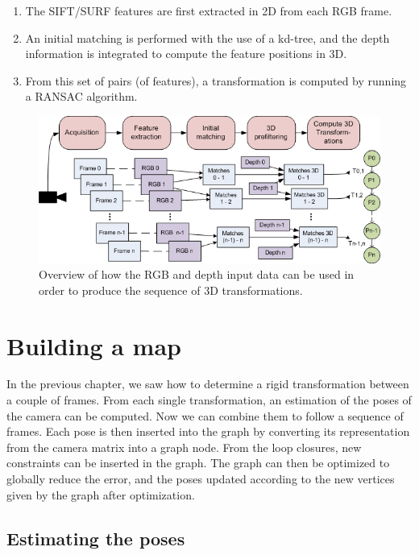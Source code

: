 \begin{enumerate}
\item The \gls{SIFT}/\gls{SURF} features are first extracted in 2D from each RGB frame.
\item An initial matching is performed with the use of a kd-tree, and the depth information is integrated to compute the feature positions in 3D.
\item From this set of pairs (of features), a transformation is computed by running a \gls{RANSAC} algorithm.
\end{enumerate}

\begin{figure}[H]
\centering
\includegraphics[width=1.0\textwidth]{figures/overview_rgb_depth}
\caption{Overview of how the RGB and depth input data can be used in order to produce the sequence of 3D transformations.}
\end{figure}

\chapter{Building a map}
\label{chap:map}

In the previous chapter, we saw how to determine a rigid transformation between a couple of frames. From each single transformation, an estimation of the poses of the camera can be computed. Now we can combine them to follow a sequence of frames. Each pose is then inserted into the graph by converting its representation from the camera matrix into a graph node. From the loop closures, new constraints can be inserted in the graph. The graph can then be optimized to globally reduce the error, and the poses updated according to the new vertices given by the graph after optimization.

\section{Estimating the poses}

